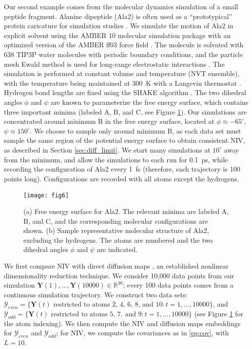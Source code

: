 Our second example comes from the molecular dynamics simulation of a small peptide fragment.
%
Alanine dipeptide (Ala2) is often used as a ``prototypical'' protein caricature for simulation studies
\cite{apostolakis1999calculation, bolhuis2000reaction, chekmarev2004long, ma2005automatic, frewen2009exploration, ferguson2011integrating}.
%
We simulate the motion of Ala2 in explicit solvent using the AMBER 10 molecular simulation package \cite{case2008Amber} with an
optimized version \cite{best2009optimized} of the AMBER ff03 force field \cite{duan2003point}.
%
The molecule is solvated with 638 TIP3P water molecules \cite{jorgensen1983comparison}
with periodic boundary conditions, and the particle mesh Ewald method is used for long-range electrostatic interactions \cite{essmann1995smooth}.
%
The simulation is performed at constant volume and temperature (NVT ensemble), with the temperature being maintained at 300~K with a Langevin thermostat \cite{loncharich1992langevin}.
%
Hydrogen bond lengths are fixed using the SHAKE algorithm \cite{ryckaert1977numerical}.
%
The two dihedral angles $\phi$ and $\psi$ are known to parameterize the free energy surface, which contains three important minima (labeled A, B, and C, see Figure \ref{fig:ala_fes}).
%
Our simulations are concentrated around minimum B in the free energy surface, located at $\phi \approx -65^{\circ}$, $\psi \approx 150^{\circ}$.
%
We choose to sample only around minimum B, as each data set must sample the same region of the potential energy surface to obtain consistent NIV, as described in Section \ref{sec:diff_limit}.
%
We start many simulations at $10^{\circ}$ away from the minimum, and allow the simulations to each run for 0.1~ps, while recording the configuration of Ala2 every 1~fs (therefore, each trajectory is 100 points long).
%
Configurations are recorded with all atoms except the hydrogens.

\begin{figure}[t]
    \texttt{[image: fig6]}
    \caption[Alanine dipeptide free energy surface and representative molecular configuration]{(a) Free energy surface for Ala2. The relevant minima are labeled A, B, and C, and the corresponding molecular configurations are shown.
    (b) Sample representative molecular structure of Ala2, excluding the hydrogens. The atoms are numbered and the two dihedral angles $\phi$ and $\psi$ are indicated.}
    \label{fig:ala_fes}
\end{figure}


We first compare NIV with direct diffusion maps \cite{coifman2005geometric}, an established nonlinear dimensionality reduction technique.
%
We consider 10,000 data points from our simulation $\mathbf{Y}(1), \dots, \mathbf{Y}(10000) \in \mathbb{R}^{30}$; every 100 data points comes from a continuous simulation trajectory.
%
We construct two data sets:
%
$\mathcal{Y}_{even} = \{\mathbf{Y}(t) \text{ restricted to atoms 2, 4, 6, 8, and 10}: t=1, \dots, 10000 \}$,
and $\mathcal{Y}_{odd} = \{\mathbf{Y}(t) \text{ restricted to atoms 5, 7, and 9}: t=1, \dots, 10000 \}$ (see Figure \ref{fig:ala_fes} for the atom indexing).
%
We then compute the NIV and diffusion maps embeddings for $\mathcal{Y}_{even}$ and $\mathcal{Y}_{odd}$;
for NIV, we compute the covariances as in \eqref{eq:cov}, with $L=10$.

